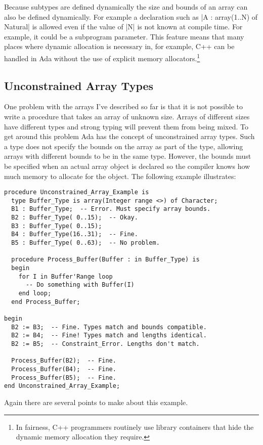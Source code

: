 Because subtypes are defined dynamically the size and bounds of an array can also be defined
dynamically. For example a declaration such as |A : array(1..N) of Natural| is allowed even if
the value of |N| is not known at compile time. For example, it could be a subprogram parameter.
This feature means that many places where dynamic allocation is necessary in, for example, C++
can be handled in Ada without the use of explicit memory allocators.\footnote{In fairness, C++
  programmers routinely use library containers that hide the dynamic memory allocation they
  require.}

\subsection{Unconstrained Array Types}

One problem with the arrays I've described so far is that it is not possible to write a
procedure that takes an array of unknown size. Arrays of different sizes have different types
and strong typing will prevent them from being mixed. To get around this problem Ada has the
concept of unconstrained array types. Such a type does not specify the bounds on the array as
part of the type, allowing arrays with different bounds to be in the same type. However, the
bounds must be specified when an actual array object is declared so the compiler knows how much
memory to allocate for the object. The following example illustrates:

\begin{lstlisting}
procedure Unconstrained_Array_Example is
  type Buffer_Type is array(Integer range <>) of Character;
  B1 : Buffer_Type;  -- Error. Must specify array bounds.
  B2 : Buffer_Type( 0..15);  -- Okay.
  B3 : Buffer_Type( 0..15);
  B4 : Buffer_Type(16..31);  -- Fine.
  B5 : Buffer_Type( 0..63);  -- No problem.

  procedure Process_Buffer(Buffer : in Buffer_Type) is
  begin
    for I in Buffer'Range loop
      -- Do something with Buffer(I)
    end loop;
  end Process_Buffer;

begin
  B2 := B3;  -- Fine. Types match and bounds compatible.
  B2 := B4;  -- Fine! Types match and lengths identical.
  B2 := B5;  -- Constraint_Error. Lengths don't match.

  Process_Buffer(B2);  -- Fine.
  Process_Buffer(B4);  -- Fine.
  Process_Buffer(B5);  -- Fine.
end Unconstrained_Array_Example;
\end{lstlisting}

Again there are several points to make about this example.

